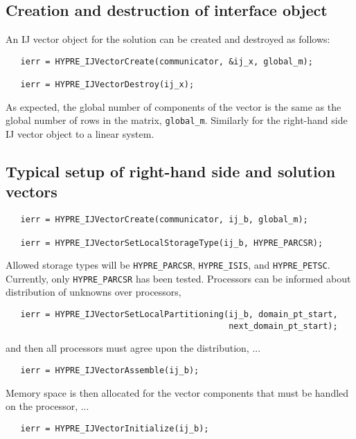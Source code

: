 \subsection{Creation and destruction of interface object}

An IJ vector object for the solution can be created and destroyed
as follows:
\begin{verbatim}
   ierr = HYPRE_IJVectorCreate(communicator, &ij_x, global_m);

   ierr = HYPRE_IJVectorDestroy(ij_x);
\end{verbatim}

\noindent As expected, the global number of components of the
vector is the same as the global number of rows in the matrix,
\verb+global_m+.
Similarly for the right-hand side IJ vector object to a linear
system.

\subsection{Typical setup of right-hand side and solution vectors}

\begin{verbatim}
   ierr = HYPRE_IJVectorCreate(communicator, ij_b, global_m);

   ierr = HYPRE_IJVectorSetLocalStorageType(ij_b, HYPRE_PARCSR);
\end{verbatim}

\noindent Allowed storage types will be \verb+HYPRE_PARCSR+,
\verb+HYPRE_ISIS+, and \verb+HYPRE_PETSC+.  Currently, only
\verb+HYPRE_PARCSR+ has been tested.  Processors can be informed
about distribution of unknowns over processors,

\begin{verbatim}
   ierr = HYPRE_IJVectorSetLocalPartitioning(ij_b, domain_pt_start,
                                             next_domain_pt_start);
\end{verbatim}

\noindent and then all processors must agree upon the distribution, ...

\begin{verbatim}
   ierr = HYPRE_IJVectorAssemble(ij_b);
\end{verbatim}

\noindent Memory space is then allocated for the vector components
that must be handled on the processor, ...

\begin{verbatim}
   ierr = HYPRE_IJVectorInitialize(ij_b);          
\end{verbatim}

